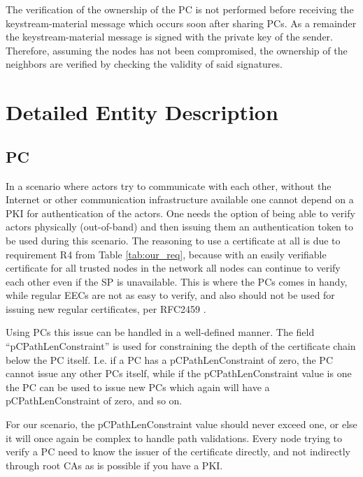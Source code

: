 The verification of the ownership of the \ac{PC} is not performed before
receiving the keystream-material message which occurs soon after sharing
\acp{PC}. As a remainder the keystream-material message is signed with the
private key of the sender. Therefore, assuming the nodes has not been
compromised, the ownership of the neighbors are verified by checking the
validity of said signatures.

\section{Detailed Entity Description}
\label{sect:detailed_ent}
\subsection{\acl{PC}}
\label{subsect:detailed_pc_descr}
In a scenario where actors try to communicate with each other, without the
Internet or other communication infrastructure available one cannot depend on a
\ac{PKI} for authentication of the actors. One needs the option of being able
to verify actors physically (out-of-band) and then issuing them an
authentication token to be used during this scenario. The reasoning to use a
certificate at all is due to requirement R4 from Table \ref{tab:our_req},
because with an easily verifiable certificate for all trusted nodes in the
network all nodes can continue to verify each other even if the SP is
unavailable. This is where the \aclp{PC} comes in handy, while regular \acp{EEC}
are not as easy to verify, and also should not be used for issuing new regular
certificates, per RFC2459 \cite{rfc2459}.

Using \acp{PC} this issue can be handled in a well-defined manner. The field
``pCPathLenConstraint'' is used for constraining the depth of the certificate
chain below the \ac{PC} itself. I.e. if a \ac{PC} has a pCPathLenConstraint of
zero, the \ac{PC} cannot issue any other \acp{PC} itself, while if the 
pCPathLenConstraint value is one the \ac{PC} can be used to issue new \acp{PC}
which again will have a pCPathLenConstraint of zero, and so on.

For our scenario, the pCPathLenConstraint value should never exceed one, or else
it will once again be complex to handle path validations. Every node trying to
verify a \ac{PC} need to know the issuer of the certificate directly, and not
indirectly through root \acp{CA} as is possible if you have a \ac{PKI}.

